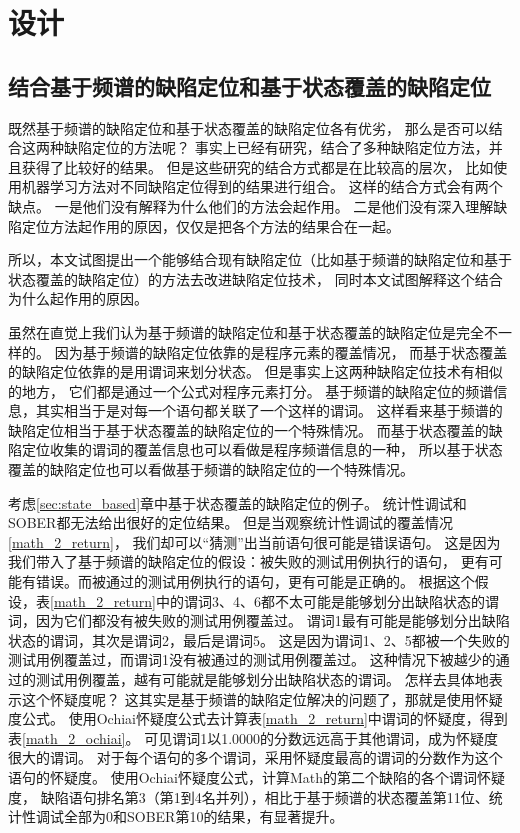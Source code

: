 \chapter{设计}

\section{结合基于频谱的缺陷定位和基于状态覆盖的缺陷定位}
\label{sec:approach_comb}

既然基于频谱的缺陷定位和基于状态覆盖的缺陷定位各有优劣，
那么是否可以结合这两种缺陷定位的方法呢？
事实上已经有研究\parencite{Le2016A,Xuan2014Learning}，结合了多种缺陷定位方法，并且获得了比较好的结果。
但是这些研究的结合方式都是在比较高的层次，
比如使用机器学习方法对不同缺陷定位得到的结果进行组合。
这样的结合方式会有两个缺点。
一是他们没有解释为什么他们的方法会起作用。
二是他们没有深入理解缺陷定位方法起作用的原因，仅仅是把各个方法的结果合在一起。

所以，本文试图提出一个能够结合现有缺陷定位（比如基于频谱的缺陷定位和基于状态覆盖的缺陷定位）的方法去改进缺陷定位技术，
同时本文试图解释这个结合为什么起作用的原因。

虽然在直觉上我们认为基于频谱的缺陷定位和基于状态覆盖的缺陷定位是完全不一样的。
因为基于频谱的缺陷定位依靠的是程序元素的覆盖情况，
而基于状态覆盖的缺陷定位依靠的是用谓词来划分状态。
但是事实上这两种缺陷定位技术有相似的地方，
它们都是通过一个公式对程序元素打分。
基于频谱的缺陷定位的频谱信息，其实相当于是对每一个语句都关联了一个这样的谓词。
这样看来基于频谱的缺陷定位相当于基于状态覆盖的缺陷定位的一个特殊情况。
而基于状态覆盖的缺陷定位收集的谓词的覆盖信息也可以看做是程序频谱信息的一种，
所以基于状态覆盖的缺陷定位也可以看做基于频谱的缺陷定位的一个特殊情况。

考虑\ref{sec:state_based}章中基于状态覆盖的缺陷定位的例子。
统计性调试和SOBER都无法给出很好的定位结果。
但是当观察统计性调试的覆盖情况\ref{math_2_return}，
我们却可以“猜测”出当前语句很可能是错误语句。
这是因为我们带入了基于频谱的缺陷定位的假设：被失败的测试用例执行的语句，
更有可能有错误。而被通过的测试用例执行的语句，更有可能是正确的。
根据这个假设，表\ref{math_2_return}中的谓词3、4、6都不太可能是能够划分出缺陷状态的谓词，因为它们都没有被失败的测试用例覆盖过。
谓词1最有可能是能够划分出缺陷状态的谓词，其次是谓词2，最后是谓词5。
这是因为谓词1、2、5都被一个失败的测试用例覆盖过，而谓词1没有被通过的测试用例覆盖过。
这种情况下被越少的通过的测试用例覆盖，越有可能就是能够划分出缺陷状态的谓词。
怎样去具体地表示这个怀疑度呢？
这其实是基于频谱的缺陷定位解决的问题了，那就是使用怀疑度公式。
使用Ochiai怀疑度公式去计算表\ref{math_2_return}中谓词的怀疑度，得到表\ref{math_2_ochiai}。
可见谓词1以1.0000的分数远远高于其他谓词，成为怀疑度很大的谓词。
对于每个语句的多个谓词，采用怀疑度最高的谓词的分数作为这个语句的怀疑度。
使用Ochiai怀疑度公式，计算Math的第二个缺陷的各个谓词怀疑度，
缺陷语句排名第3（第1到4名并列），相比于基于频谱的状态覆盖第11位、统计性调试全部为0和SOBER第10的结果，有显著提升。

